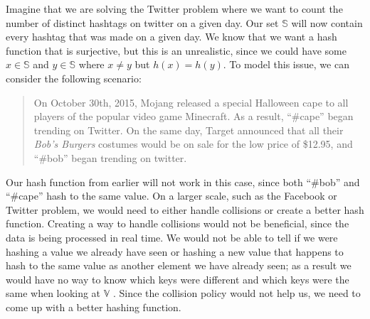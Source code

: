 \documentclass{article}
\begin{document}
\indent Imagine that we are solving the Twitter problem where we want to count the number of distinct hashtags on twitter on a given day. 
Our set $\mathbb{S}$ will now contain every hashtag that was made on a given day. 
We know that we want a hash function that is surjective, but this is an unrealistic, since we could have some $x \in \mathbb{S}$ and $y\in\mathbb{S}$ where $x \neq y$ but $h(x) = h(y)$. 
To model this issue, we can consider the following scenario:
\begin{quote}
On October 30th, 2015, Mojang released a special Halloween cape to all players of the popular video game Minecraft. 
As a result, ``\#cape'' began trending on Twitter.
On the same day, Target announced that all their \textit{Bob's Burgers} costumes would be on sale for the low price of \$12.95, and ``\#bob'' began trending on twitter.
\end{quote}  \clearpage
Our hash function from earlier will not work in this case, since both ``\#bob'' and ``\#cape'' hash to the same value. 
On a larger scale, such as the Facebook or Twitter problem, we would need to either handle collisions or create a better hash function. 
Creating a way to handle collisions would not be beneficial, since the data is being processed in real time. 
We would not be able to tell if we were hashing a value we already have seen or hashing a new value that happens to hash to the same value as another element we have already seen; as a result we would have no way to know which keys were different and which keys were the same when looking at $\mathbb{V}$ \cite[p. 6]{Maurer}. 
Since the collision policy would not help us, we need to come up with a better hashing function.\\
\end{document}
